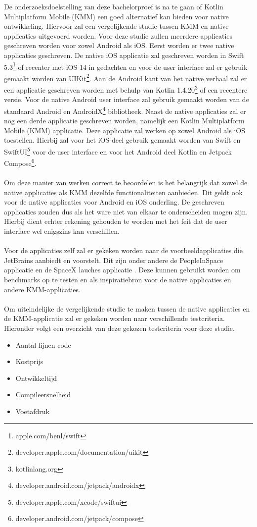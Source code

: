 De onderzoeksdoelstelling van deze bachelorproef is na te gaan of Kotlin Multiplatform Mobile (KMM) een goed alternatief kan bieden voor native ontwikkeling. Hiervoor zal een vergelijkende studie tussen KMM en native applicaties uitgevoerd worden. Voor deze studie zullen meerdere applicaties geschreven worden voor zowel Android als iOS. Eerst worden er twee native applicaties geschreven. De native iOS applicatie zal geschreven worden in Swift 5.3\footnote{apple.com/benl/swift} of recenter met iOS 14 in gedachten en voor de user interface zal er gebruik gemaakt worden van UIKit\footnote{developer.apple.com/documentation/uikit}. Aan de Android kant van het native verhaal zal er een applicatie geschreven worden met behulp van Kotlin 1.4.20\footnote{kotlinlang.org} of een recentere versie. Voor de native Android user interface zal gebruik gemaakt worden van de standaard Android en AndroidX\footnote{developer.android.com/jetpack/androidx} bibliotheek. Naast de native applicaties zal er nog een derde applicatie geschreven worden, namelijk een Kotlin Multiplatform Mobile (KMM) applicatie. Deze applicatie zal werken op zowel Android als iOS toestellen. Hierbij zal voor het iOS-deel gebruik gemaakt worden van Swift en SwiftUI\footnote{developer.apple.com/xcode/swiftui} voor de user interface en voor het Android deel Kotlin en Jetpack Compose\footnote{developer.android.com/jetpack/compose}.
\\ \\
Om deze manier van werken correct te beoordelen is het belangrijk dat zowel de native applicaties als KMM dezelfde functionaliteiten aanbieden. Dit geldt ook voor de native applicaties voor Android en iOS onderling. De geschreven applicaties zouden dus als het ware niet van elkaar te onderscheiden mogen zijn. Hierbij dient echter rekening gehouden te worden met het feit dat de user interface wel enigszins kan verschillen.
\\ \\
Voor de applicaties zelf zal er gekeken worden naar de voorbeeldapplicaties die JetBrains aanbiedt en voorstelt. Dit zijn onder andere de PeopleInSpace applicatie \autocite{OReilly2021} en de SpaceX lauches applicatie \autocite{Kotlin2020HandsOn}. Deze kunnen gebruikt worden om benchmarks op te testen en als inspiratiebron voor de native applicaties en andere KMM-applicaties.
\\ \\
Om uiteindelijke de vergelijkende studie te maken tussen de native applicaties en de KMM-applicatie zal er gekeken worden naar verschillende testcriteria. Hieronder volgt een overzicht van deze gekozen testcriteria voor deze studie.
\begin{itemize}
    \item Aantal lijnen code
    \item Kostprijs
    \item Ontwikkeltijd
    \item Compileersnelheid
    \item Voetafdruk
\end{itemize}

